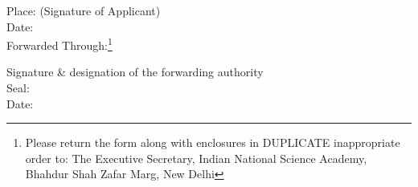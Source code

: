 \documentclass[12pt,a4paper]{article}
\begin{document}
\noindent
Place:		  \hfill	(Signature of Applicant) 
\\
Date: 	
\\[.5cm]


\noindent
Forwarded Through:\footnote{Please return the form along with enclosures in DUPLICATE inappropriate order to: The Executive Secretary, Indian National Science Academy, Bhahdur Shah Zafar Marg, New Delhi} 

\hfill
\hspace{5cm} Signature \& designation of the forwarding authority \\

\hfill\hspace{5cm} Seal: \\


\hfill\hspace{5cm} Date:
\end{document}
